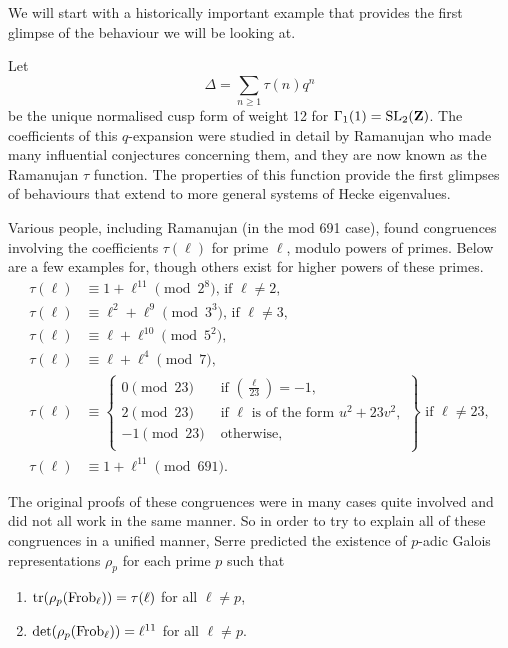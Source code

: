 \documentclass[a4paper,12pt]{article}
\begin{document}
We will start with a historically important example that provides the first glimpse of the behaviour we will be looking at.

\begin{ex}\label{ex:delt}
Let
\[
\Delta = \sum_{n \ge 1} \tau(n) q^n
\]
be the unique normalised cusp form of weight 12 for $\Gamma_1(1) = \operatorname{SL}_2(\mathbf{Z})$.
The coefficients of this $q$-expansion were studied in detail by Ramanujan who made many influential conjectures concerning them, and they are now known as the Ramanujan $\tau$ function.
The properties of this function provide the first glimpses of behaviours that extend to more general systems of Hecke eigenvalues.

Various people, including Ramanujan (in the mod 691 case), found congruences involving the coefficients $\tau(\ell)$ for prime $\ell$, modulo powers of primes.
Below are a few examples for, though others exist for higher powers of these primes.
\begin{align}
\tau(\ell) &\equiv 1 + \ell^{11} \pmod{2^8}\text{, if } \ell \ne 2,\label{eq:tau2}\\
\tau(\ell) &\equiv \ell^2 + \ell^9 \pmod{3^3}\text{, if } \ell \ne 3,\label{eq:tau3}\\
\tau(\ell) &\equiv \ell + \ell^{10} \pmod{5^2},\label{eq:tau5}\\
\tau(\ell) &\equiv \ell + \ell^4 \pmod{7},\label{eq:tau7}\\
\tau(\ell) &\equiv\left.\begin{cases}
0\pmod{23} & \text{ if } \left(\frac{\ell}{23}\right) = -1,\\
2\pmod{23} & \text{ if }\ell\text{ is of the form } u^2 + 23v^2,\\
-1\pmod{23} & \text{ otherwise},\\
\end{cases}\right\}\text{ if } \ell \ne 23,\label{eq:tau23}\\
\tau(\ell) &\equiv 1 + \ell^{11} \pmod{691}.\label{eq:tau691}
\end{align}

The original proofs of these congruences were in many cases quite involved and did not all work in the same manner.
So in order to try to explain all of these congruences in a unified manner, Serre predicted \cite{Serre67} the existence of $p$-adic Galois representations $\rho_p$ for each prime $p$ such that
\begin{enumerate}
\item $\operatorname{tr}(\rho_p (\operatorname{Frob}_\ell)) = \tau(\ell)$ for all $\ell \ne p$,\label{item:trace}
\item $\det(\rho_p (\operatorname{Frob}_\ell)) = \ell^{11}$ for all $\ell \ne p$.\label{item:det}
\end{enumerate}


\end{ex}
\end{document}
